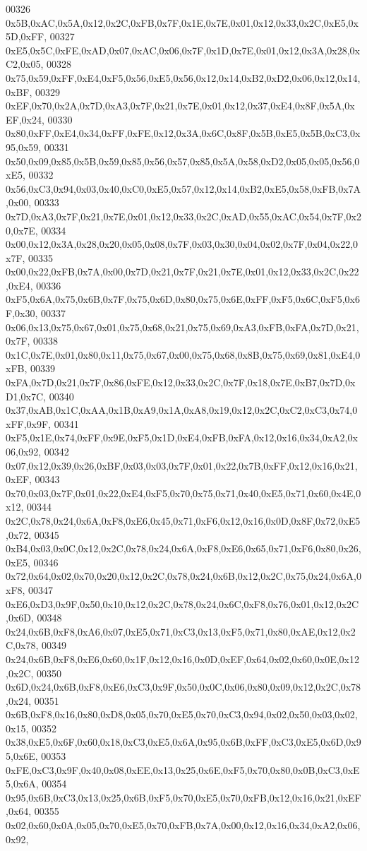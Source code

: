 \begin{DoxyCode}
00326 0x5B,0xAC,0x5A,0x12,0x2C,0xFB,0x7F,0x1E,0x7E,0x01,0x12,0x33,0x2C,0xE5,0x5D,0xFF,
00327 0xE5,0x5C,0xFE,0xAD,0x07,0xAC,0x06,0x7F,0x1D,0x7E,0x01,0x12,0x3A,0x28,0xC2,0x05,
00328 0x75,0x59,0xFF,0xE4,0xF5,0x56,0xE5,0x56,0x12,0x14,0xB2,0xD2,0x06,0x12,0x14,0xBF,
00329 0xEF,0x70,0x2A,0x7D,0xA3,0x7F,0x21,0x7E,0x01,0x12,0x37,0xE4,0x8F,0x5A,0xEF,0x24,
00330 0x80,0xFF,0xE4,0x34,0xFF,0xFE,0x12,0x3A,0x6C,0x8F,0x5B,0xE5,0x5B,0xC3,0x95,0x59,
00331 0x50,0x09,0x85,0x5B,0x59,0x85,0x56,0x57,0x85,0x5A,0x58,0xD2,0x05,0x05,0x56,0xE5,
00332 0x56,0xC3,0x94,0x03,0x40,0xC0,0xE5,0x57,0x12,0x14,0xB2,0xE5,0x58,0xFB,0x7A,0x00,
00333 0x7D,0xA3,0x7F,0x21,0x7E,0x01,0x12,0x33,0x2C,0xAD,0x55,0xAC,0x54,0x7F,0x20,0x7E,
00334 0x00,0x12,0x3A,0x28,0x20,0x05,0x08,0x7F,0x03,0x30,0x04,0x02,0x7F,0x04,0x22,0x7F,
00335 0x00,0x22,0xFB,0x7A,0x00,0x7D,0x21,0x7F,0x21,0x7E,0x01,0x12,0x33,0x2C,0x22,0xE4,
00336 0xF5,0x6A,0x75,0x6B,0x7F,0x75,0x6D,0x80,0x75,0x6E,0xFF,0xF5,0x6C,0xF5,0x6F,0x30,
00337 0x06,0x13,0x75,0x67,0x01,0x75,0x68,0x21,0x75,0x69,0xA3,0xFB,0xFA,0x7D,0x21,0x7F,
00338 0x1C,0x7E,0x01,0x80,0x11,0x75,0x67,0x00,0x75,0x68,0x8B,0x75,0x69,0x81,0xE4,0xFB,
00339 0xFA,0x7D,0x21,0x7F,0x86,0xFE,0x12,0x33,0x2C,0x7F,0x18,0x7E,0xB7,0x7D,0xD1,0x7C,
00340 0x37,0xAB,0x1C,0xAA,0x1B,0xA9,0x1A,0xA8,0x19,0x12,0x2C,0xC2,0xC3,0x74,0xFF,0x9F,
00341 0xF5,0x1E,0x74,0xFF,0x9E,0xF5,0x1D,0xE4,0xFB,0xFA,0x12,0x16,0x34,0xA2,0x06,0x92,
00342 0x07,0x12,0x39,0x26,0xBF,0x03,0x03,0x7F,0x01,0x22,0x7B,0xFF,0x12,0x16,0x21,0xEF,
00343 0x70,0x03,0x7F,0x01,0x22,0xE4,0xF5,0x70,0x75,0x71,0x40,0xE5,0x71,0x60,0x4E,0x12,
00344 0x2C,0x78,0x24,0x6A,0xF8,0xE6,0x45,0x71,0xF6,0x12,0x16,0x0D,0x8F,0x72,0xE5,0x72,
00345 0xB4,0x03,0x0C,0x12,0x2C,0x78,0x24,0x6A,0xF8,0xE6,0x65,0x71,0xF6,0x80,0x26,0xE5,
00346 0x72,0x64,0x02,0x70,0x20,0x12,0x2C,0x78,0x24,0x6B,0x12,0x2C,0x75,0x24,0x6A,0xF8,
00347 0xE6,0xD3,0x9F,0x50,0x10,0x12,0x2C,0x78,0x24,0x6C,0xF8,0x76,0x01,0x12,0x2C,0x6D,
00348 0x24,0x6B,0xF8,0xA6,0x07,0xE5,0x71,0xC3,0x13,0xF5,0x71,0x80,0xAE,0x12,0x2C,0x78,
00349 0x24,0x6B,0xF8,0xE6,0x60,0x1F,0x12,0x16,0x0D,0xEF,0x64,0x02,0x60,0x0E,0x12,0x2C,
00350 0x6D,0x24,0x6B,0xF8,0xE6,0xC3,0x9F,0x50,0x0C,0x06,0x80,0x09,0x12,0x2C,0x78,0x24,
00351 0x6B,0xF8,0x16,0x80,0xD8,0x05,0x70,0xE5,0x70,0xC3,0x94,0x02,0x50,0x03,0x02,0x15,
00352 0x38,0xE5,0x6F,0x60,0x18,0xC3,0xE5,0x6A,0x95,0x6B,0xFF,0xC3,0xE5,0x6D,0x95,0x6E,
00353 0xFE,0xC3,0x9F,0x40,0x08,0xEE,0x13,0x25,0x6E,0xF5,0x70,0x80,0x0B,0xC3,0xE5,0x6A,
00354 0x95,0x6B,0xC3,0x13,0x25,0x6B,0xF5,0x70,0xE5,0x70,0xFB,0x12,0x16,0x21,0xEF,0x64,
00355 0x02,0x60,0x0A,0x05,0x70,0xE5,0x70,0xFB,0x7A,0x00,0x12,0x16,0x34,0xA2,0x06,0x92,

\end{DoxyCode}
